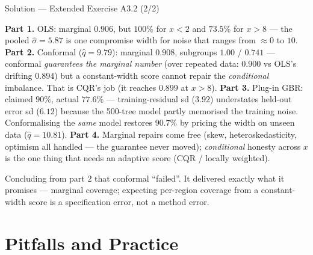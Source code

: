 \documentclass[aspectratio=169,11pt]{beamer}
\begin{document}
\begin{frame}{Solution --- Extended Exercise A3.2 (2/2)}
\begin{solutionbox}
  \textbf{Part 1.} OLS: marginal $0.906$, but $100\%$ for $x < 2$ and $73.5\%$ for
  $x > 8$ --- the pooled $\hat\sigma = 5.87$ is one compromise width for noise that
  ranges from $\approx 0$ to $10$.
  \textbf{Part 2.} Conformal ($\hat q = 9.79$): marginal $0.908$, subgroups $1.00$ /
  $0.741$ --- conformal \emph{guarantees the marginal number} (over repeated data:
  $0.900$ vs OLS's drifting $0.894$) but a constant-width score cannot repair the
  \emph{conditional} imbalance. That is CQR's job (it reaches $0.899$ at $x > 8$).
  \textbf{Part 3.} Plug-in GBR: claimed $90\%$, actual $\mathbf{77.6\%}$ ---
  training-residual sd ($3.92$) understates held-out error sd ($6.12$) because the
  500-tree model partly memorised the training noise. Conformalising the \emph{same}
  model restores $90.7\%$ by pricing the width on unseen data ($\hat q = 10.81$).
  \textbf{Part 4.} Marginal repairs come free (skew, heteroskedasticity, optimism all
  handled --- the guarantee never moved); \emph{conditional} honesty across $x$ is the
  one thing that needs an adaptive score (CQR / locally weighted).
\end{solutionbox}
\begin{mistake}
  Concluding from part 2 that conformal ``failed''. It delivered exactly what it
  promises --- marginal coverage; expecting per-region coverage from a constant-width
  score is a specification error, not a method error.
\end{mistake}
\end{frame}

\section{Pitfalls and Practice}
\end{document}
